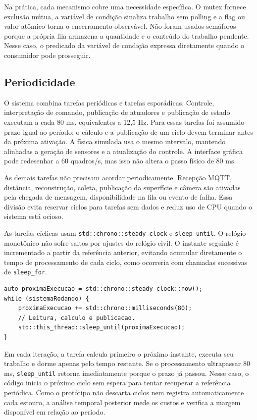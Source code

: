 \documentclass[12pt,a4paper]{article}
\begin{document}
Na prática, cada mecanismo cobre uma necessidade específica. O mutex fornece exclusão mútua, a variável de condição sinaliza trabalho sem polling e a flag ou valor atômico torna o encerramento observável. Não foram usados semáforos porque a própria fila armazena a quantidade e o conteúdo do trabalho pendente. Nesse caso, o predicado da variável de condição expressa diretamente quando o consumidor pode prosseguir.

\subsection{Periodicidade}

O sistema combina tarefas periódicas e tarefas esporádicas. Controle, interpretação de comando, publicação de atuadores e publicação de estado executam a cada 80 ms, equivalentes a 12,5 Hz. Para essas tarefas foi assumido prazo igual ao período: o cálculo e a publicação de um ciclo devem terminar antes da próxima ativação. A física simulada usa o mesmo intervalo, mantendo alinhadas a geração de sensores e a atualização do controle. A interface gráfica pode redesenhar a 60 quadros/s, mas isso não altera o passo físico de 80 ms.

As demais tarefas não precisam acordar periodicamente. Recepção MQTT, distância, reconstrução, coleta, publicação da superfície e câmera são ativadas pela chegada de mensagem, disponibilidade na fila ou evento de falha. Essa divisão evita reservar ciclos para tarefas sem dados e reduz uso de CPU quando o sistema está ocioso.

As tarefas cíclicas usam \texttt{std::chrono::steady\_clock} e \texttt{sleep\_until}. O relógio monotônico não sofre saltos por ajustes do relógio civil. O instante seguinte é incrementado a partir da referência anterior, evitando acumular diretamente o tempo de processamento de cada ciclo, como ocorreria com chamadas sucessivas de \texttt{sleep\_for}.

\begin{lstlisting}[style=cppstyle,caption={Padrão usado nas tarefas periódicas.}]
auto proximaExecucao = std::chrono::steady_clock::now();
while (sistemaRodando) {
    proximaExecucao += std::chrono::milliseconds(80);
    // Leitura, calculo e publicacao.
    std::this_thread::sleep_until(proximaExecucao);
}
\end{lstlisting}

Em cada iteração, a tarefa calcula primeiro o próximo instante, executa seu trabalho e dorme apenas pelo tempo restante. Se o processamento ultrapassar 80 ms, \texttt{sleep\_until} retorna imediatamente porque o prazo já passou. Nesse caso, o código inicia o próximo ciclo sem espera para tentar recuperar a referência periódica. Como o protótipo não descarta ciclos nem registra automaticamente cada estouro, a análise temporal posterior mede os custos e verifica a margem disponível em relação ao período.
\end{document}
